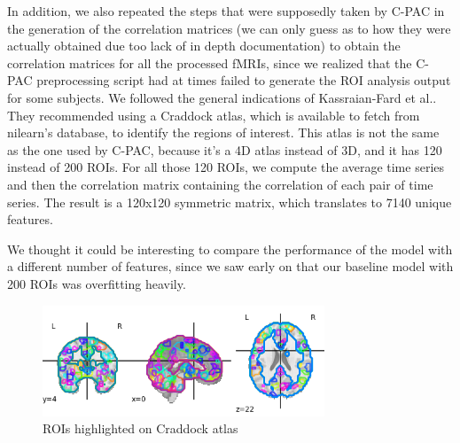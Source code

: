In addition, we also repeated the steps that were supposedly taken by C-PAC in the generation of the correlation matrices (we can only guess as to how they were actually obtained due too lack of in depth documentation) to obtain the correlation matrices for all the processed fMRIs, since we realized that the C-PAC preprocessing script had at times failed to generate the ROI analysis output for some subjects. We followed the general indications of Kassraian-Fard et al.\cite{guidelinesml}. They recommended using a Craddock atlas, which is available to fetch from nilearn's\cite{10.3389/fninf.2014.00014} database, to identify the regions of interest. This atlas is not the same as the one used by C-PAC, because it's a 4D atlas instead of 3D, and it has 120 instead of 200 ROIs. For all those 120 ROIs, we compute the average time series and then the correlation matrix containing the correlation of each pair of time series. The result is a 120x120 symmetric matrix, which translates to 7140 unique features.

We thought it could be interesting to compare the performance of the model with a different number of features, since we saw early on that our baseline model with 200 ROIs was overfitting heavily. 

\begin{figure}[h]
\caption{ROIs highlighted on Craddock atlas}
\centering
\includegraphics[width=0.75\textwidth]{final_report/atlas.png}
\end{figure}



